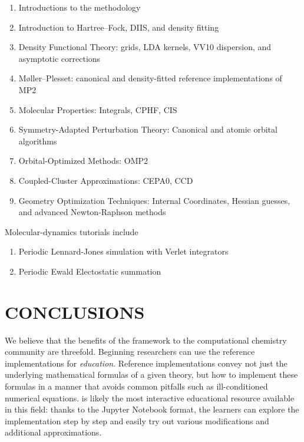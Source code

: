 \documentclass[%
  class = book,%
  crop = false,%
  float = true,%
  multi = true,%
  preview = false,%
]{standalone}
\newcommand{\caps}[1]{\uppercase{#1}}
\begin{document}
\begin{enumerate}
\item Introductions to the \pfn methodology
\item Introduction to Hartree--Fock, DIIS, and density fitting
\item Density Functional Theory: grids, LDA kernels, VV10 dispersion, and asymptotic corrections
\item M\o ller--Plesset: canonical and density-fitted reference implementations of MP2
\item Molecular Properties: Integrals, CPHF, CIS
\item Symmetry-Adapted Perturbation Theory: Canonical and atomic orbital algorithms
\item Orbital-Optimized Methods: OMP2
\item Coupled-Cluster Approximations: CEPA0, CCD
\item  Geometry Optimization Techniques: Internal Coordinates, Hessian guesses, and advanced Newton-Raphson methods
\end{enumerate}
Molecular-dynamics tutorials include
\begin{enumerate}
\item Periodic Lennard-Jones simulation with Verlet integrators
\item Periodic Ewald Electostatic summation
\end{enumerate}

\section{\texorpdfstring{\caps{Conclusions}}{Conclusions}}

We believe that the benefits of the \pfn framework to the computational chemistry community are threefold.  Beginning researchers can use the \pfn reference implementations for \emph{education}. Reference implementations convey not just the underlying mathematical formulas of a given theory, but how to implement these formulas in a manner that avoids common pitfalls such as ill-conditioned numerical equations. \pfn is likely the most interactive educational resource available in this field: thanks to the Jupyter Notebook format, the learners can explore the implementation step by step and easily try out various modifications and additional approximations.
\end{document}
